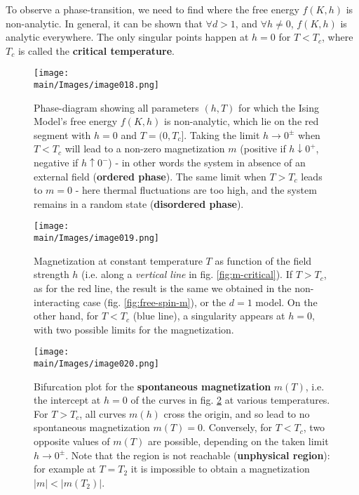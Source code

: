 \documentclass[../../main.tex]{subfiles}
\begin{document}
\medskip

To observe a phase-transition, we need to find where the free energy $f(K,h)$ is non-analytic. In general, it can be shown that $\forall d > 1$, and $\forall h \neq 0$, $f(K,h)$ is analytic everywhere. The only singular points happen at $h=0$ for $T < T_c$, where $T_c$ is called the \textbf{critical temperature}. 

\begin{figure}[H]
    \centering
    \texttt{[image: \\main/Images/image018.png]} 
    \caption{Phase-diagram showing all parameters $(h,T)$ for which the Ising Model's free energy $f(K,h)$ is non-analytic, which lie on the red segment with $h=0$ and $T=(0,T_c]$. Taking the limit $h \to 0^\pm$ when $T < T_c$ will lead to a non-zero magnetization $m$ (positive if $h \downarrow 0^+$, negative if $h \uparrow 0^-$) - in other words the system  in absence of an external field (\textbf{ordered phase}). The same limit when $T > T_c$ leads to $m = 0$ - here thermal fluctuations are too high, and the system remains in a random state (\textbf{disordered phase}).\label{fig:non-analytic}}
\end{figure}

\begin{figure}[H]
    \centering
    \texttt{[image: \\main/Images/image019.png]}
    \caption{Magnetization at constant temperature $T$ as function of the field strength $h$ (i.e. along a \textit{vertical line} in fig. \ref{fig:m-critical}). If $T > T_c$, as for the red line, the result is the same we obtained in the non-interacting case (fig. \ref{fig:free-spin-m}), or the $d=1$ model. On the other hand, for $T < T_c$ (blue line), a singularity appears at $h=0$, with two possible limits for the magnetization.\label{fig:m-plot}}
\end{figure}

\begin{figure}[H]
    \centering
    \texttt{[image: \\main/Images/image020.png]}
    \caption{Bifurcation plot for the \textbf{spontaneous magnetization} $m(T)$, i.e. the intercept at $h=0$ of the curves in fig. \ref{fig:m-plot} at various temperatures. For $T > T_c$, all curves $m(h)$ cross the origin, and so lead to no spontaneous magnetization $m(T) = 0$. Conversely, for $T < T_c$, two opposite values of $m(T)$ are possible, depending on the taken limit $h \to 0^\pm$. Note that the region  is not reachable (\textbf{unphysical region}): for example at $T = T_2$ it is impossible to obtain a magnetization $|m| < |m(T_2)|$. \label{fig:spont-m}}
\end{figure}
\end{document}
